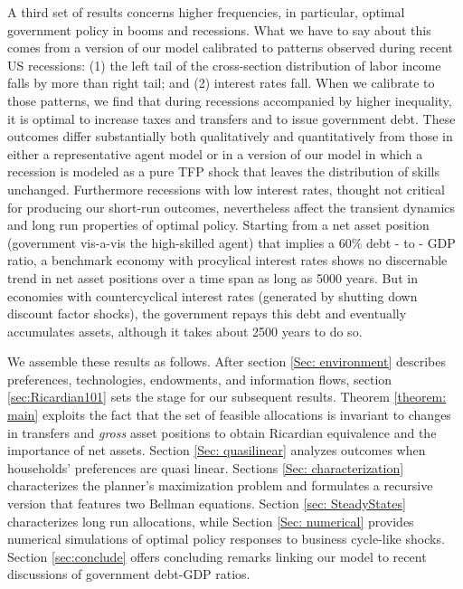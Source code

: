 \documentclass[thmsb,11pt]{article}
\begin{document}
A third set of results concerns higher frequencies, in particular,  optimal government policy in booms and recessions.
What we have to say about this comes from a  version of our model calibrated to patterns observed
 during recent US recessions:  (1) the left tail of the cross-section distribution of labor income falls by more than right tail; and (2) interest rates fall. When we calibrate  to those patterns, we find that during recessions accompanied by higher inequality, it is  optimal to increase taxes and transfers and to issue
government debt. %
These outcomes differ substantially both qualitatively and quantitatively from those in either a representative agent model or in a version of
 our model in which a  recession is modeled as a pure TFP shock that leaves the distribution of skills unchanged. Furthermore recessions with low interest rates, thought not critical for producing our short-run outcomes, nevertheless  affect the transient dynamics and long run properties of optimal policy. Starting from a net asset position (government vis-a-vis the high-skilled agent) that implies a 60\% debt - to - GDP ratio, a benchmark economy with procylical interest rates shows no discernable trend in net asset positions over a time span as long as 5000 years. But in economies with countercyclical interest rates  (generated by shutting down discount factor shocks), the government repays this debt and eventually accumulates assets, although it takes about 2500 years to do so.



We assemble these results as follows.
After section \ref{Sec: environment} describes preferences, technologies, endowments, and
information flows, section
\ref{sec:Ricardian101} sets the stage for our subsequent results. Theorem \ref{theorem: main}
exploits the fact that the set of feasible allocations is invariant to changes in transfers and \emph{gross} asset positions to obtain  Ricardian equivalence and the importance of net assets.  Section \ref{Sec: quasilinear}
analyzes outcomes when households' preferences are quasi linear. Sections \ref{Sec: characterization} characterizes  the planner's maximization problem and formulates a recursive version that features two Bellman equations. Section \ref{sec: SteadyStates} characterizes  long run allocations, while Section \ref{Sec: numerical} provides numerical simulations of  optimal policy responses to business cycle-like shocks.
Section \ref{sec:conclude} offers concluding remarks linking our model to recent discussions of government debt-GDP ratios.
\end{document}
